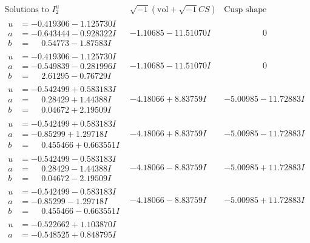 \documentclass[1p]{elsarticle_modified}
\theoremstyle{definition}
\newcommand{\I}{\sqrt{-1}}
\begin{document}
$$\begin{array}{c|c|c}
\text{Solutions to }I^u_{2}& \I (\text{vol} + \sqrt{-1}CS) & \text{Cusp shape}\\
 \hline 
\begin{aligned}
u &= -0.419306 - 1.125730 I \\
a &= -0.643444 - 0.928322 I \\
b &= \phantom{-}0.54773 - 1.87583 I\end{aligned}
 & -1.10685 - 11.51070 I & \phantom{-0.000000 } 0 \\ \hline\begin{aligned}
u &= -0.419306 - 1.125730 I \\
a &= -0.549839 - 0.281996 I \\
b &= \phantom{-}2.61295 - 0.76729 I\end{aligned}
 & -1.10685 - 11.51070 I & \phantom{-0.000000 } 0 \\ \hline\begin{aligned}
u &= -0.542499 + 0.583183 I \\
a &= \phantom{-}0.28429 + 1.44388 I \\
b &= \phantom{-}0.04672 + 2.19509 I\end{aligned}
 & -4.18066 + 8.83759 I & -5.00985 - 11.72883 I \\ \hline\begin{aligned}
u &= -0.542499 + 0.583183 I \\
a &= -0.85299 + 1.29718 I \\
b &= \phantom{-}0.455466 + 0.663551 I\end{aligned}
 & -4.18066 + 8.83759 I & -5.00985 - 11.72883 I \\ \hline\begin{aligned}
u &= -0.542499 - 0.583183 I \\
a &= \phantom{-}0.28429 - 1.44388 I \\
b &= \phantom{-}0.04672 - 2.19509 I\end{aligned}
 & -4.18066 - 8.83759 I & -5.00985 + 11.72883 I \\ \hline\begin{aligned}
u &= -0.542499 - 0.583183 I \\
a &= -0.85299 - 1.29718 I \\
b &= \phantom{-}0.455466 - 0.663551 I\end{aligned}
 & -4.18066 - 8.83759 I & -5.00985 + 11.72883 I \\ \hline\begin{aligned}
u &= -0.522662 + 1.103870 I \\
a &= -0.548525 + 0.848795 I \\

\end{aligned}
\end{array}$$
\end{document}
